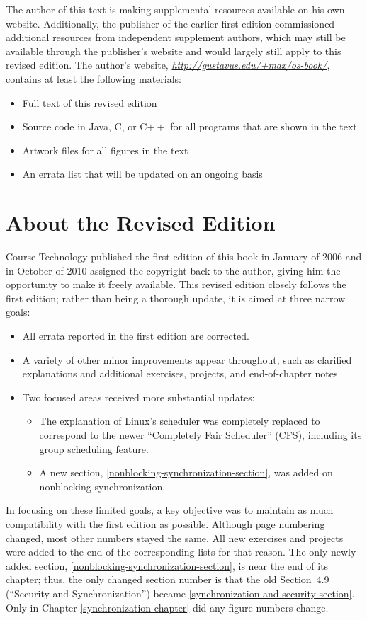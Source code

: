 The author of this text is making supplemental resources available on
his own website.  Additionally, the publisher of the
earlier first edition commissioned
additional resources from independent supplement authors,
which may still be available through the publisher's website
and would largely still apply to this revised edition.
The author's website, \textit{\url{http://gustavus.edu/+max/os-book/}},
contains at least the following materials:
\begin{itemize}
\item
Full text of this revised edition
\item
Source code in Java, C, or C$++$ for all programs
that are shown in the text
\item
Artwork files for all figures in the text
\item
An errata list that will be updated on an ongoing basis
\end{itemize}

\section*{About the Revised Edition}
Course Technology published the first edition of this book in January of 2006
and in October of 2010 assigned the copyright back to the author, giving him
the opportunity to make it freely available.  This revised edition closely follows
the first edition; rather than being a thorough update, it is aimed at three narrow goals:
\begin{itemize}
\item All errata reported in the first edition are corrected.
\item A variety of other minor improvements appear throughout, such as clarified explanations and additional exercises, projects, and end-of-chapter notes.
\item Two focused areas received more substantial updates:
\begin{itemize}
\item The explanation of Linux's scheduler was completely replaced to correspond to the newer ``Completely Fair Scheduler'' (CFS), including its group scheduling feature.
\item A new section, \ref{nonblocking-synchronization-section}, was added on nonblocking synchronization.
\end{itemize}
\end{itemize}

In focusing on these limited goals, a key objective was to maintain as much compatibility with the first edition as possible.  Although page numbering changed, most other numbers stayed the same.  All new exercises and projects were added to the end of the corresponding lists for that reason.  The only newly added section, \ref{nonblocking-synchronization-section}, is near the end of its chapter; thus, the only changed section number is that the old Section~4.9 (``Security and Synchronization'') became \ref{synchronization-and-security-section}.  Only in Chapter \ref{synchronization-chapter} did any figure numbers change.

